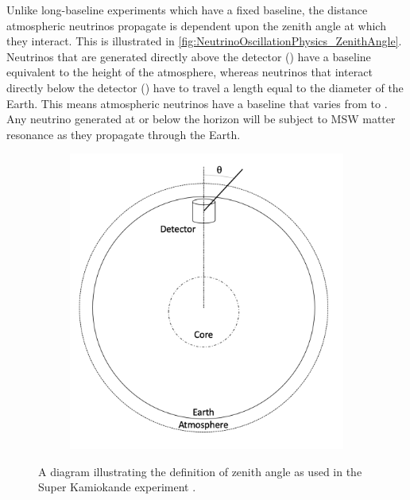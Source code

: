 Unlike long-baseline experiments which have a fixed baseline, the distance atmospheric neutrinos propagate is dependent upon the zenith angle at which they interact. This is illustrated in \autoref{fig:NeutrinoOscillationPhysics_ZenithAngle}. Neutrinos that are generated directly above the detector () have a baseline equivalent to the height of the atmosphere, whereas neutrinos that interact directly below the detector () have to travel a length equal to the diameter of the  Earth. This means atmospheric neutrinos have a baseline that varies from  to . Any neutrino generated at or below the horizon will be subject to MSW matter resonance as they propagate through the Earth.

\begin{figure}[h]
  \begin{subfigure}[t]{0.40\textwidth}
    \includegraphics[width=\textwidth, trim={0mm 0mm 0mm 0mm}, clip,page=1]{Figures/Theory/ZenithAngle.pdf}
  \end{subfigure}
  \caption{A diagram illustrating the definition of zenith angle as used in the Super Kamiokande experiment \cite{Ashie_2005}.}
  \label{fig:NeutrinoOscillationPhysics_ZenithAngle}
\end{figure}

